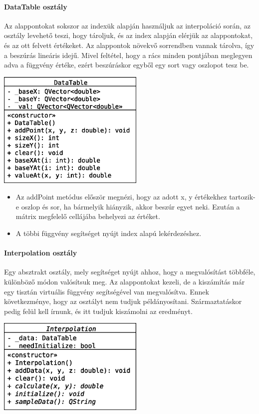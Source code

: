 \documentclass[12pt]{report}
\begin{document}
\paragraph{DataTable osztály}
Az alappontokat sokszor az indexük alapján használjuk az interpoláció során, az osztály levehető teszi, hogy tároljuk, és az index alapján elérjük az alappontokat, és az ott felvett értékeket. Az alappontok növekvő sorrendben vannak tárolva, így a beszúrás lineáris idejű. Mivel feltétel, hogy a rács minden pontjában meglegyen adva a függvény értéke, ezért beszúráskor egyből egy sort vagy oszlopot tesz be.
\begin{center}
\includegraphics[width=7cm]{pics/uml/DataTable}
\end{center}
\begin{itemize}
\item Az addPoint metódus először megnézi, hogy az adott x, y értékekhez tartozik-e oszlop és sor, ha bármelyik hiányzik, akkor beszúr egyet neki. Ezután a mátrix megfelelő cellájába behelyezi az értéket.
\item A többi függvény segítséget nyújt index alapú lekérdezéshez.
\end{itemize}

\paragraph{Interpolation osztály}
Egy absztrakt osztály, mely segítséget nyújt ahhoz, hogy a megvalósítást többféle, különböző módon valósítsuk meg. Az alappontokat kezeli, de a kiszámítás már egy tisztán virtuális függvény segítségével van megvalósítva. Ennek következménye, hogy az osztályt nem tudjuk példányosítani. Származtatáskor pedig felül kell írnunk, és itt tudjuk kiszámolni az eredményt.
\begin{center}
\includegraphics[width=7cm]{pics/uml/Interpolation}
\end{center}
\end{document}
